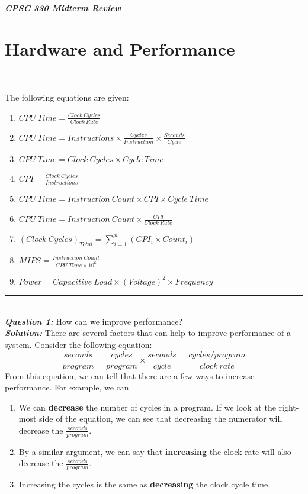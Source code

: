 \documentclass{article}
\begin{document}
\begin{center}
\textbf{\textit{CPSC 330 Midterm Review}}\\
\end{center}

\section*{Hardware and Performance}
\hrule
\noindent\\
\indent The following equations are given:
\begin{enumerate}
\item $CPU\ Time = \frac{Clock\ Cycles}{Clock\ Rate}$
\item $CPU\ Time = Instructions \times \frac{Cycles}{Instruction} \times \frac{Seconds}{Cycle}$
\item $CPU\ Time = Clock\ Cycles \times Cycle\ Time$
\item $CPI = \frac{Clock\ Cycles}{Instructions}$
\item $CPU\ Time = Instruction\ Count \times CPI \times Cycle\ Time$
\item $CPU\ Time = Instruction\ Count \times \frac{CPI}{Clock\ Rate}$
\item $(Clock\ Cycles)_{Total} = \sum_{i = 1}^{n}\left(CPI_{i} \times Count_{i}\right)$
\item $MIPS = \frac{Instruction\ Count}{CPU\ Time \times 10^{6}}$
\item $Power = Capacitive\ Load \times (Voltage)^{2} \times Frequency$
\end{enumerate}


\hrule
\noindent \\
\indent \textit{\textbf{Question 1:}} How can we improve performance?\\
\noindent \textit{\textbf{Solution:}} There are several factors that can help to improve performance of a system. Consider the following equation:
\[
\frac{seconds}{program} = \frac{cycles}{program} \times \frac{seconds}{cycle} = \frac{cycles/program}{clock\ rate}
\]
\noindent From this equation, we can tell that there are a few ways to increase performance. For example, we can
\begin{enumerate}
\item We can \textbf{decrease} the number of cycles in a program. If we look at the right-most side of the equation, we can see that decreasing the numerator will decrease the $\frac{seconds}{program}$.
\item By a similar argument, we can say that \textbf{increasing} the clock rate will also decrease the $\frac{seconds}{program}$.
\item Increasing the cycles is the same as \textbf{decreasing} the clock cycle time.
\end{enumerate}
\end{document}
